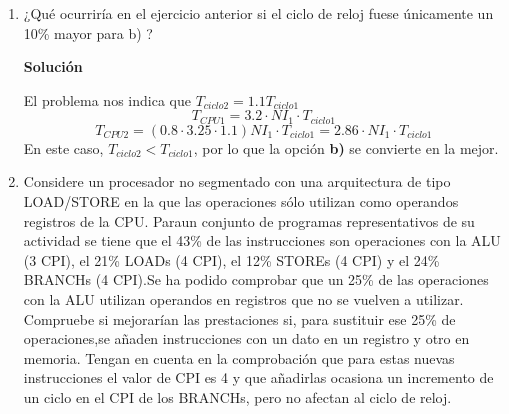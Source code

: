 \documentclass[12pt,spanish]{article}
\newenvironment{solution}{
	\par
	\textbf{Solución}
	\par
	\begin{center}
}
{
	\end{center}
}
\begin{document}
\begin{enumerate}
\begin{solution}
\begin{itemize}
\item $CPI_1=\frac{0.2\cdot NI_1}{NI_1} \cdot 4 + \frac{0.8 \cdot NI_1}{NI_1} \cdot 3 = 3.2$ 
\item $T_{CPU1}=NI_1 \cdot CPI_1 \cdot T_{ciclo1}= 3.2 \cdot NI_1 \cdot T_{ciclo1}$
\item $CPI_2=\frac{0.2\cdot NI_1}{0.8 \cdot NI_1} \cdot 4 + \frac{0.6 \cdot NI_1}{0.8 \cdot NI_1} \cdot 3 = 3.25$ 
\item $T_{CPU2}=0.8 \cdot NI_1 \cdot 3.25 \cdot 1.33 \cdot T_{ciclo1}= 3.45 \cdot NI_1 \cdot T_{ciclo1}$
\end{itemize}
Como $T_{CPU1} < T_{CPU2} $, la mejor opción es la \textbf{a)}.

\end{solution}
\item ¿Qué ocurriría en el ejercicio anterior si el ciclo de reloj fuese únicamente un 10\% mayor para b) ?
\begin{solution}
El problema nos indica que $T_{ciclo2}=1.1T_{ciclo1}$
\[T_{CPU1}=3.2 \cdot NI_1 \cdot T_{ciclo1}\]
\[T_{CPU2}=(0.8 \cdot 3.25 \cdot 1.1)NI_1 \cdot T_{ciclo1}=2.86 \cdot NI_1 \cdot T_{ciclo1}\]
En este caso, $T_{ciclo2} < T_{ciclo1}$, por lo que la opción \textbf{b)} se convierte en la mejor.
\end{solution}
\item Considere un procesador no segmentado con una arquitectura de tipo LOAD/STORE en la que las operaciones   sólo   utilizan   como   operandos   registros   de   la   CPU.   Paraun   conjunto   de   programas representativos de su actividad se tiene que el 43\% de las instrucciones son operaciones con la ALU (3 CPI), el 21\% LOADs (4 CPI), el 12\% STOREs (4 CPI) y el 24\% BRANCHs (4 CPI).Se ha podido comprobar que un 25\% de las operaciones con la ALU utilizan operandos en registros que no se vuelven  a  utilizar. Compruebe  si  mejorarían  las  prestaciones si,  para  sustituir  ese  25\%  de  operaciones,se añaden instrucciones con un dato en un registro y otro en memoria. Tengan en cuenta en la comprobación que para estas nuevas instrucciones el valor de CPI es 4 y que añadirlas ocasiona un incremento de un ciclo en el CPI de los BRANCHs, pero no afectan al ciclo de reloj.


\end{enumerate}
\end{document}
